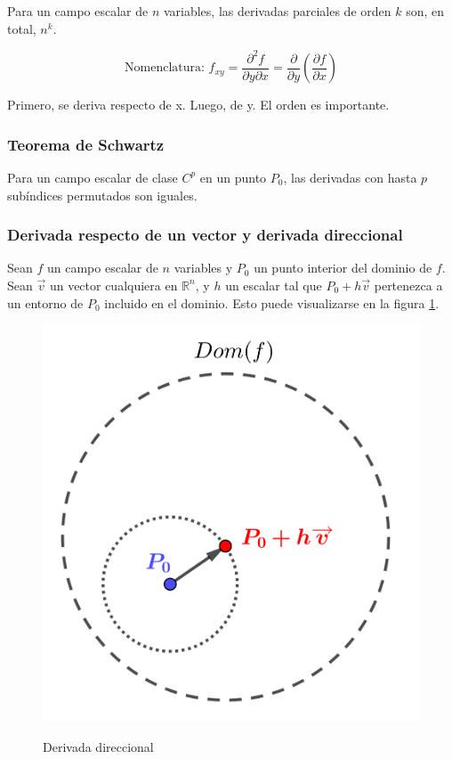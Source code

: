 \documentclass{article}
\renewcommand{\Bbb}{\mathbb}
\begin{document}
Para un campo escalar de $n$ variables, las derivadas parciales de orden $k$ son, en total, $n^k$.

\begin{equation}
\text{Nomenclatura:  } f_{xy} = \frac{\partial^2 f}{\partial y \partial x } = \frac{\partial}{\partial y} \left( \frac{\partial f}{\partial x} \right)
\end{equation}

Primero, se deriva respecto de x. Luego, de y. El orden es importante.

\subsubsection{Teorema de Schwartz}

Para un campo escalar de clase $C^p$ en un punto $P_0$, las derivadas con hasta $p$ subíndices permutados son iguales.

\subsubsection{Derivada respecto de un vector y derivada direccional}

Sean $f$ un campo escalar de $n$ variables y $P_0$ un punto interior del dominio de $f$. Sean $\overrightarrow{v}$ un vector cualquiera en $\Bbb R^n$, y $h$ un escalar tal que $P_0 + h \overrightarrow{v}$ pertenezca a un entorno de $P_0$ incluido en el dominio. Esto puede visualizarse en la figura \ref{fig:deriv_direcc}.

\begin{figure}[ht]
\centering
\caption{Derivada direccional}
\includegraphics[scale=0.75]{img/derivadas/deriv_direcc.png}
\label{fig:deriv_direcc}
\end{figure}
\end{document}
